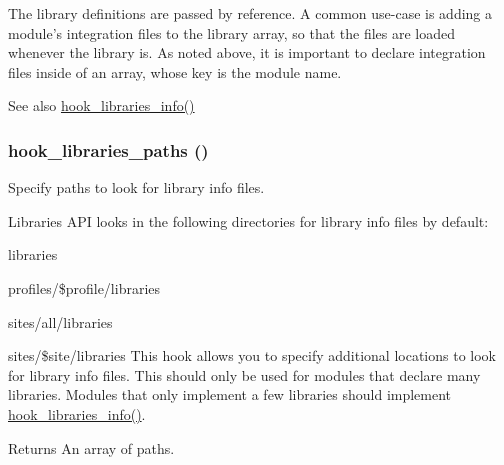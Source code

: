 The library definitions are passed by reference. A common use-\/case is adding a module's integration files to the library array, so that the files are loaded whenever the library is. As noted above, it is important to declare integration files inside of an array, whose key is the module name.

\begin{DoxySeeAlso}{See also}
\hyperlink{libraries_8api_8php_abe57a1a01f1d2d134a9014258fe9e016}{hook\_\-libraries\_\-info()} 
\end{DoxySeeAlso}
\hypertarget{libraries_8api_8php_ad555eecec1a3347c79dce2ef7d09c24c}{
\subsubsection[{hook\_\-libraries\_\-paths}]{\setlength{\rightskip}{0pt plus 5cm}hook\_\-libraries\_\-paths ()}}
\label{libraries_8api_8php_ad555eecec1a3347c79dce2ef7d09c24c}
Specify paths to look for library info files.

Libraries API looks in the following directories for library info files by default:
\begin{DoxyItemize}
\item libraries
\item profiles/\$profile/libraries
\item sites/all/libraries
\item sites/\$site/libraries This hook allows you to specify additional locations to look for library info files. This should only be used for modules that declare many libraries. Modules that only implement a few libraries should implement \hyperlink{libraries_8api_8php_abe57a1a01f1d2d134a9014258fe9e016}{hook\_\-libraries\_\-info()}.
\end{DoxyItemize}

\begin{DoxyReturn}{Returns}
An array of paths. 
\end{DoxyReturn}
